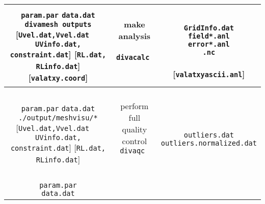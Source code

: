 \begin{table}
\begin{center}
{{\begin{tabular}{c|c|c}
 \shortstack{
 {  { }  } \\
 {\tt param.par} \\
 {\tt data.dat} \\
 {\tt divamesh outputs} \\
 {[{\tt Uvel.dat,Vvel.dat}} \\
 { $\quad ${\tt UVinfo.dat, constraint.dat}]} \\
 {[{\tt RL.dat, RLinfo.dat}]} \\
 {[{\tt valatxy.coord}] }
}
 & 
\shortstack{
{  { }  } \\
{\sf make analysis} \\
{  { }  } \\
{\tt divacalc    } 
\\
{  { }  } \\
{  { }  } \\
{  { }  }
}
& 
\shortstack{
{  { }  } \\
{\tt GridInfo.dat} \\
{\tt field*.anl} \\
{\tt error*.anl} \\
{\tt *.nc} \\
{  { }  } \\
{[{\tt valatxyascii.anl}]}
} 
\\ \hline
 \shortstack{
 {  { }  } \\
 {\tt param.par} \\
 {\tt data.dat} \\
 {\tt ./output/meshvisu/*} \\
 {[{\tt Uvel.dat,Vvel.dat}} \\
 { $\quad ${\tt UVinfo.dat, constraint.dat}]} \\
 {[{\tt RL.dat, RLinfo.dat}]} 
}
 & 
\shortstack{
{  { }  } \\
{\sf perform full quality control} \\
{\tt divaqc    } 
\\
{  { }  } \\
{  { }  } \\
{  { }  }
}
& 
\shortstack{
{  { }  } \\
{  { }  } \\
{{\tt outliers.dat}} \\
{{\tt outliers.normalized.dat}} \\
{  { }  } \\
{  { }  } 
} 
\\ \hline
 \shortstack{
 {\tt param.par} \\
 {\tt data.dat} \\
}
\end{tabular}}}
\end{center}
\end{table}
